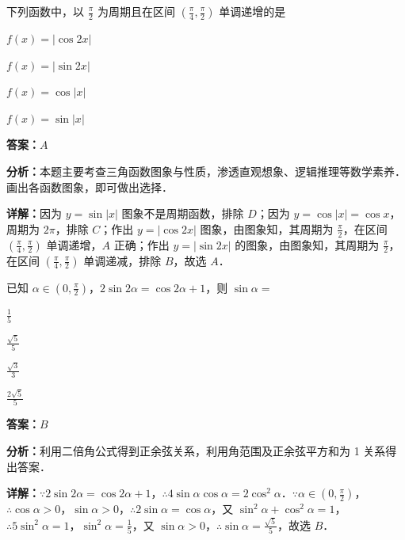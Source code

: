 \begin{question}[points=5]
下列函数中，以 $\frac{\pi}{2}$ 为周期且在区间 $(\frac{\pi}{4},\frac{\pi}{2})$ 单调递增的是
\begin{choices}
  \item $f(x)=|\cos 2x|$
  \item $f(x)=|\sin 2x|$
  \item $f(x)=\cos|x|$
  \item $f(x)=\sin|x|$
\end{choices}
\begin{solution}
\textbf{答案：}$A$

\textbf{分析：}本题主要考查三角函数图象与性质，渗透直观想象、逻辑推理等数学素养．画出各函数图象，即可做出选择．

\textbf{详解：}因为 $y=\sin|x|$ 图象不是周期函数，排除 $D$；因为 $y=\cos|x|=\cos x$，周期为 $2\pi$，排除 $C$；作出 $y=|\cos 2x|$ 图象，由图象知，其周期为 $\frac{\pi}{2}$，在区间 $(\frac{\pi}{4},\frac{\pi}{2})$ 单调递增，$A$ 正确；作出 $y=|\sin 2x|$ 的图象，由图象知，其周期为 $\frac{\pi}{2}$，在区间 $(\frac{\pi}{4},\frac{\pi}{2})$ 单调递减，排除 $B$，故选 $A$．
\end{solution}
\end{question}

\begin{question}[points=5]
已知 $\alpha\in(0,\frac{\pi}{2})$，$2\sin 2\alpha=\cos 2\alpha+1$，则 $\sin\alpha=$
\begin{choices}
  \item $\frac{1}{5}$
  \item $\frac{\sqrt{5}}{5}$
  \item $\frac{\sqrt{3}}{3}$
  \item $\frac{2\sqrt{5}}{5}$
\end{choices}
\begin{solution}
\textbf{答案：}$B$

\textbf{分析：}利用二倍角公式得到正余弦关系，利用角范围及正余弦平方和为 1 关系得出答案．

\textbf{详解：}$\because 2\sin 2\alpha=\cos 2\alpha+1$，$\therefore 4\sin\alpha\cos\alpha=2\cos^2\alpha$．$\because \alpha\in(0,\frac{\pi}{2})$，$\therefore \cos\alpha>0$，$\sin\alpha>0$，$\therefore 2\sin\alpha=\cos\alpha$，又 $\sin^2\alpha+\cos^2\alpha=1$，$\therefore 5\sin^2\alpha=1$，$\sin^2\alpha=\frac{1}{5}$，又 $\sin\alpha>0$，$\therefore \sin\alpha=\frac{\sqrt{5}}{5}$，故选 $B$．
\end{solution}
\end{question}

